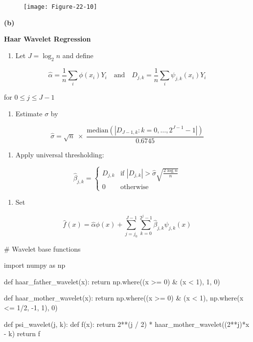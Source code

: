 \begin{figure}[H]
\centering
\texttt{[image: Figure-22-10]}
\end{figure}

\textbf{(b)}

\textbf{Haar Wavelet Regression}

\begin{enumerate}[tightlist,label={\arabic*.}]
\item
  Let \(J = \log_{2} n\) and define
\end{enumerate}

\[ \hat{\alpha} = \frac{1}{n} \sum_{i} \phi(x_{i}) Y_{i}
\quad \text{and} \quad
D_{j, k} = \frac{1}{n} \sum_{i} \psi_{j, k}(x_{i}) Y_{i}
\]

for \(0 \leq j \leq J - 1\)

\begin{enumerate}[tightlist,label={\arabic*.}]
\item
  Estimate \(\sigma\) by
\end{enumerate}

\[ \hat{\sigma} = \sqrt{n} \; \times \; \frac{\text{median} \left( \left| D_{J-1, k} : k = 0, \dots, 2^{J - 1} - 1\right| \right)}{0.6745} \]

\begin{enumerate}[tightlist,label={\arabic*.},resume]
\item
  Apply universal thresholding:
\end{enumerate}

\[ \hat{\beta}_{j, k} = \begin{cases}
D_{j, k} & \text{if } \left| D_{j, k} \right| > \hat{\sigma} \sqrt{\frac{2 \log n}{n}} \\
0 & \text{otherwise}
\end{cases}\]

\begin{enumerate}[tightlist,label={\arabic*.},resume]
\item
  Set
\end{enumerate}

\[ \hat{f}(x) = \hat{\alpha} \phi(x) + \sum_{j = j_{0}}^{J - 1} \sum_{k = 0}^{2^{j} - 1} \hat{\beta}_{j, k} \psi_{j, k}(x) \]

\begin{python}
# Wavelet base functions

import numpy as np

def haar_father_wavelet(x):
    return np.where((x >= 0) & (x < 1), 1, 0)

def haar_mother_wavelet(x):
    return np.where((x >= 0) & (x < 1),  np.where(x <= 1/2, -1, 1), 0)

def psi_wavelet(j, k):
    def f(x):
        return 2**(j / 2) * haar_mother_wavelet((2**j)*x - k)
    return f
\end{python}

